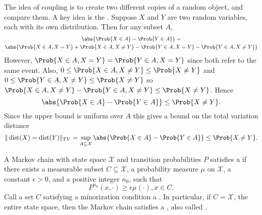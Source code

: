 \documentclass[12pt]{article}
\begin{document}
The idea of coupling is to create two different copies of a random
object, and compare them.  A key idea is the .%
Suppose \( X \) and \( Y \) are two random variables, each with its own
distribution.  Then for any subset \( A \),
\begin{multline*}
    \abs{\Prob{X \in A} - \Prob{Y \in A}} = \\
    \abs{ \Prob{X \in A, X = Y} + \Prob{X \in A, X \ne Y } - \Prob{Y \in
    A, X = Y} - \Prob{Y \in A, X \ne Y}}
\end{multline*}
However, \( \Prob{X \in A, X = Y} = \Prob{Y \in A, X = Y} \) since both
refer to the same event.  Also, \( 0 \le \Prob{X \in A, X \ne Y} \le
\Prob{X \ne Y} \) and \( 0 \le \Prob{Y \in A, X \ne Y} \le \Prob{X \ne Y}
\) so \( \Prob{X \in A, X \ne Y} - \Prob{Y \in A, X \ne Y} \le \Prob{X
\ne Y} \).  Hence
\[
    \abs{\Prob{X \in A} - \Prob{Y \in A}} \le \Prob{X \ne Y}.
\] Since the upper bound is uniform over \( A \) this gives a bound on
the total variation distance
\begin{equation}
    \label{eqn:convergencestationary:tvbound} \|
    \operatorname{dist}
    (X) =
    \operatorname{dist}
    (Y) \|_{TV} = \sup_{A \subseteq \mathcal{X}} \abs{\Prob{X \in A} -
    \Prob{Y \in A}} \le \Prob{X \ne Y}.
\end{equation}
\begin{definition}
    A Markov chain with state space \( \mathcal{X} \) and transition
    probabilities \( P \) satisfies a %
    if there exists a measurable subset \( C \subseteq \mathcal{X} \), a
    probability measure \( \mu \) on \( \mathcal{X} \), a constant \(
    \epsilon > 0 \), and a positive integer \( n_0 \), such that
    \[
        P^{n_0} (x, \cdot) \ge \epsilon \mu(\cdot), x \in C.
    \] Call a set \( C \) satisfying a minorization condition a .%
    In particular, if \( C = \mathcal{X} \), the entire state space,
    then the Markov chain satisfies a ,%
    also called .%
\end{definition}
\end{document}
